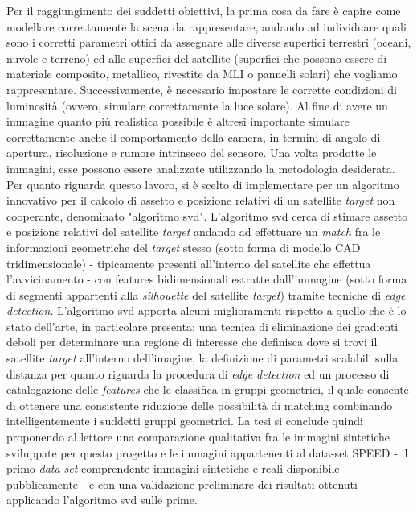 Per il raggiungimento dei suddetti obiettivi, la prima cosa da fare è capire come modellare correttamente la scena da rappresentare, andando ad individuare quali sono i corretti parametri ottici da assegnare alle diverse superfici terrestri (oceani, nuvole e terreno) ed alle superfici del satellite (superfici che possono essere di materiale composito, metallico, rivestite da MLI o pannelli solari) che vogliamo rappresentare. Successivamente, è necessario impostare le corrette condizioni di luminosità (ovvero, simulare correttamente la luce solare). Al fine di avere un immagine quanto più realistica possibile è altresì importante simulare correttamente anche il comportamento della camera, in termini di angolo di apertura, risoluzione e rumore intrinseco del sensore. Una volta prodotte le immagini, esse possono essere analizzate utilizzando la metodologia desiderata. Per quanto riguarda questo lavoro, si è scelto di implementare per un algoritmo innovativo per il calcolo di assetto e posizione relativi di un satellite \textit{target} non cooperante, denominato "algoritmo \acrshort{svd}".
L'algoritmo \acrshort{svd} cerca di stimare assetto e posizione relativi del satellite \textit{target} andando ad effettuare un \textit{match} fra le informazioni geometriche del \textit{target} stesso (sotto forma di modello CAD tridimensionale)  - tipicamente presenti all'interno del satellite che effettua l'avvicinamento - con features bidimensionali estratte dall'immagine (sotto forma di segmenti appartenti alla \textit{silhouette} del satellite \textit{target}) tramite tecniche di \textit{edge detection}.
L'algoritmo \acrshort{svd} apporta alcuni miglioramenti rispetto a quello che è lo stato dell'arte, in particolare presenta: una tecnica di eliminazione dei gradienti deboli per determinare una regione di interesse che definisca dove si trovi il satellite \textit{target} all'interno dell'imagine, la definizione di parametri scalabili sulla distanza per quanto riguarda la procedura di \textit{edge detection} ed un processo di catalogazione delle \textit{features} che le classifica in gruppi geometrici, il quale consente di ottenere una consistente riduzione delle possibilità di matching combinando intelligentemente i suddetti gruppi geometrici.
La tesi si conclude quindi proponendo al lettore una comparazione qualitativa fra le immagini sintetiche sviluppate per questo progetto  e le immagini appartenenti al data-set SPEED - il primo \textit{data-set} comprendente immagini sintetiche e reali disponibile pubblicamente - e con una validazione preliminare dei risultati ottenuti applicando l'algoritmo \acrshort{svd} sulle prime.